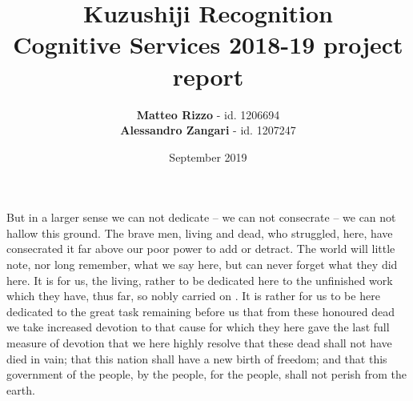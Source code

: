 \documentclass{pasa}
\title[Kuzushiji Recognition]{Kuzushiji Recognition \\ \large Cognitive Services 2018-19 project report}
\author[Matteo Rizzo, Alessandro Zangari]{\textbf{Matteo Rizzo} - id. 1206694\\ \textbf{Alessandro Zangari} - id. 1207247\\}%
\date{September 2019}
\begin{document}


\maketitle

























But in a larger sense we can not dedicate -- we can not consecrate -- we can not hallow this ground. The brave men, living and dead, who struggled, here, have consecrated it far above our poor power to add or detract. The world will little note, nor long remember, what we say here, but can never forget what they did here. It is for us, the living, rather to be dedicated here to the unfinished work which they have, thus far, so nobly carried on \cite{abt1961}. It is rather for us to be here dedicated to the great task remaining before us  that from these honoured dead we take increased devotion to that cause for which they here gave the last full measure of devotion  that we here highly resolve that these dead shall not have died in vain; that this nation shall have a new birth of freedom; and that this government \cite{abt1961} of the people, by the people, for the people, shall not perish from the earth.
\end{document}

